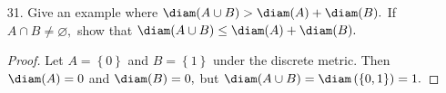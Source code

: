 \documentclass{article}
\begin{document}
\begin{itemize}
		Theorem 3.8': Let $1<p<\infty.$ If $f, g\in C([0, 1]).$ then $\left\lVert f+g \right\rVert_p\le \left\lVert f \right\rVert_p + \left\lVert g \right\rVert_p.$
		\begin{proof}
			Let $q$ be the conjugate of $p.$ By the triangle inequality and Holder's inequality, we have
			\begin{align*}
				\abs{f(x)+g(x)}^p &= \abs{f(x)+g(x)}\cdot \abs{f(x)+g(x)}^{p-1} \\
				&\le \abs{f(x)}\cdot \abs{f(x)+g(x)}^{p-1} + \abs{g(x)}\cdot \abs{f(x)+g(x)}^{p-1} \\
				\implies \int_0^1\abs{f(x)+g(x)}^p\, dx &\le \int_0^1 \abs{f(x)}\cdot \abs{f(x)+g(x)}^{p-1}\, dx + \int_0^1 \abs{g(x)}\cdot \abs{f(x)+g(x)}^{p-1}\, dx \\
				&\le \left\lVert f \right\rVert_p \left\lVert (f+g)^{p-1} \right\rVert_q + \left\lVert g \right\rVert_p\left\lVert (f+g)^{p-1} \right\rVert_q 
			\end{align*}
			Now, since $1/p+1/q=1\implies q=\frac{p}{p-1},$ we have
			\begin{align*}
				\left\lVert (f+g))^{p-1} \right\rVert_q &= \left(\int_0^1 \left(f(x)+g(x)^{p-1}\right)^{\frac{p}{p-1}}\, dx\right)^{\frac{p-1}{p}} \\
				&= \left(\left( \int_0^1 \abs{f(x)+g(x)}^p\, dx \right)^{1/p}\right)^{(p-1)} \\
				&= \left\lVert f+g \right\rVert_p^{p-1}
			\end{align*}
			so it follows that
			\begin{align*}
				\int_0^1\abs{f(x)+g(x)}^p\, dx = \left\lVert f+g \right\rVert_p^p &\le \left(\left\lVert f \right\rVert_p + \left\lVert g \right\rVert_p\right)\cdot \left\lVert f+g \right\rVert_p^{p-1} \\
				\implies \left\lVert f+g\right\rVert_p &\le \left\lVert f \right\rVert_p + \left\lVert g \right\rVert_p
			\end{align*}
			as desired.
		\end{proof}

	\item[31.] Give an example where $\diam(A\cup B)>\diam(A)+\diam(B).$ If $A\cap B\neq\varnothing,$ show that $\diam(A\cup B)\le \diam(A)+\diam(B).$
		\begin{proof}
			Let $A=\left\{ 0 \right\}$ and $B=\left\{ 1 \right\}$ under the discrete metric. Then $\diam(A)=0$ and $\diam(B)=0,$ but $\diam(A\cup B)=\diam\left( \left\{ 0, 1 \right\} \right) = 1.$


\end{proof}
\end{itemize}
\end{document}
